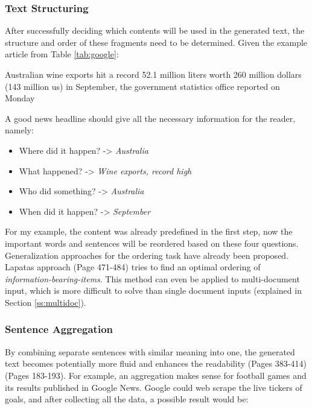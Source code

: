 \subsubsection{Text Structuring}

After successfully deciding which contents will be used in the generated text, the structure and order of these fragments need to be determined. Given the example article from Table \ref{tab:google}:

\begin{tcolorbox}
	\begin{center}
		Australian wine exports hit a record 52.1 million liters worth 260 million dollars (143 million us) in September, the government statistics office reported on Monday 
	\end{center}
\end{tcolorbox}

A good news headline should give all the necessary information for the reader, namely:

\begin{itemize}
	\item Where did it happen? -> \textit{Australia}
	\item What happened? -> \textit{Wine exports, record high}
	\item Who did something? -> \textit{Australia}
	\item When did it happen? -> \textit{September}
\end{itemize}

For my example, the content was already predefined in the first step, now the important words and sentences will be reordered based on these four questions. Generalization approaches for the ordering task have already been proposed. Lapatas approach \cite{lapata} (Page 471-484) tries to find an optimal ordering of \textit{information-bearing-items}. This method can even be applied to multi-document input, which is more difficult to solve than single document inputs (explained in Section \ref{ss:multidoc}).

\subsubsection{Sentence Aggregation}

By combining separate sentences with similar meaning into one, the generated text becomes potentially more fluid and enhances the readability \cite{dal} (Pages 383-414) \cite{cheng-mellish2000} (Pages 183-193). For example, an aggregation makes sense for football games and its results published in Google News. Google could web scrape the live tickers of goals, and after collecting all the data, a possible result would be:

